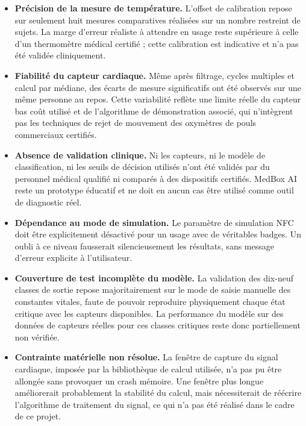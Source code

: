 \documentclass[12pt,a4paper]{report}
\begin{document}
\begin{itemize}
    \item \textbf{Précision de la mesure de température.} L'offset de calibration repose sur seulement huit mesures comparatives réalisées sur un nombre restreint de sujets. La marge d'erreur réaliste à attendre en usage reste supérieure à celle d'un thermomètre médical certifié ; cette calibration est indicative et n'a pas été validée cliniquement.
    \item \textbf{Fiabilité du capteur cardiaque.} Même après filtrage, cycles multiples et calcul par médiane, des écarts de mesure significatifs ont été observés sur une même personne au repos. Cette variabilité reflète une limite réelle du capteur bas coût utilisé et de l'algorithme de démonstration associé, qui n'intègrent pas les techniques de rejet de mouvement des oxymètres de pouls commerciaux certifiés.
    \item \textbf{Absence de validation clinique.} Ni les capteurs, ni le modèle de classification, ni les seuils de décision utilisés n'ont été validés par du personnel médical qualifié ni comparés à des dispositifs certifiés. MedBox AI reste un prototype éducatif et ne doit en aucun cas être utilisé comme outil de diagnostic réel.
    \item \textbf{Dépendance au mode de simulation.} Le paramètre de simulation NFC doit être explicitement désactivé pour un usage avec de véritables badges. Un oubli à ce niveau fausserait silencieusement les résultats, sans message d'erreur explicite à l'utilisateur.
    \item \textbf{Couverture de test incomplète du modèle.} La validation des dix-neuf classes de sortie repose majoritairement sur le mode de saisie manuelle des constantes vitales, faute de pouvoir reproduire physiquement chaque état critique avec les capteurs disponibles. La performance du modèle sur des données de capteurs réelles pour ces classes critiques reste donc partiellement non vérifiée.
    \item \textbf{Contrainte matérielle non résolue.} La fenêtre de capture du signal cardiaque, imposée par la bibliothèque de calcul utilisée, n'a pas pu être allongée sans provoquer un crash mémoire. Une fenêtre plus longue améliorerait probablement la stabilité du calcul, mais nécessiterait de réécrire l'algorithme de traitement du signal, ce qui n'a pas été réalisé dans le cadre de ce projet.
\end{itemize}

\end{document}

